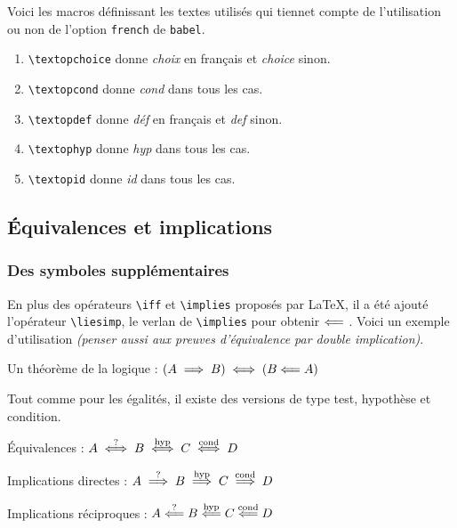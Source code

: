 \documentclass[12pt,a4paper]{article}
\theoremstyle{definition}
\begin{document}
Voici les macros définissant les textes utilisés qui tiennet compte de l'utilisation ou non de l'option \verb+french+ de \verb+babel+.

\begin{enumerate}
	\item \verb+\textopchoice+ donne \emph{\og choix \fg} en français et \emph{\og choice \fg} sinon.

	\item \verb+\textopcond+ donne \emph{\og cond \fg} dans tous les cas.

	\item \verb+\textopdef+ donne \emph{\og déf \fg} en français et \emph{\og def \fg} sinon.

	\item \verb+\textophyp+ donne \emph{\og hyp \fg} dans tous les cas.

	\item \verb+\textopid+ donne \emph{\og id \fg} dans tous les cas.
\end{enumerate}





\subsection{Équivalences et implications}

\subsubsection{Des symboles supplémentaires}

En plus des opérateurs \verb+\iff+ et \verb+\implies+ proposés par \LaTeX{}, il a été ajouté l'opérateur \verb+\liesimp+, le verlan de \verb+\implies+ pour obtenir $\mathrel{\Longleftarrow}$ . Voici un exemple d'utilisation \emph{(penser aussi aux preuves d'équivalence par double implication)}.

\begin{tcblisting}{}
Un théorème de la logique : $(A \implies B) \iff (B \liesimp A)$
\end{tcblisting}


Tout comme pour les égalités, il existe des versions de type test, hypothèse et condition.

\begin{tcblisting}{}
Équivalences : $A \ifftest B \iffhyp C \iffcond D$

Implications directes : $A \impliestest B \implieshyp C \impliescond D$

Implications réciproques : $A \liesimptest B \liesimphyp C \liesimpcond D$
\end{tcblisting}
\end{document}
